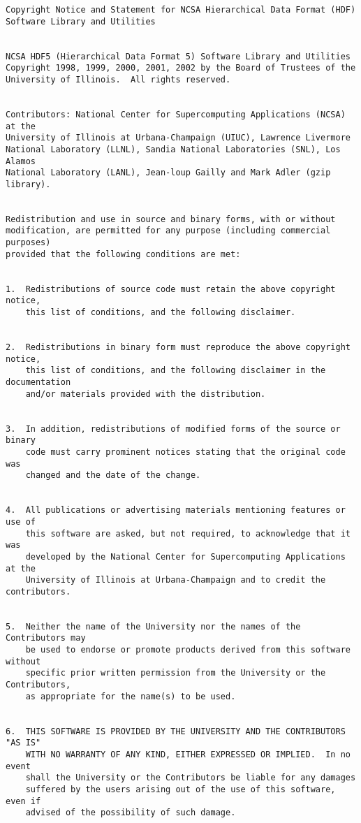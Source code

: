 \begin{verbatim}
Copyright Notice and Statement for NCSA Hierarchical Data Format (HDF)
Software Library and Utilities


NCSA HDF5 (Hierarchical Data Format 5) Software Library and Utilities 
Copyright 1998, 1999, 2000, 2001, 2002 by the Board of Trustees of the 
University of Illinois.  All rights reserved.


Contributors: National Center for Supercomputing Applications (NCSA) at the
University of Illinois at Urbana-Champaign (UIUC), Lawrence Livermore 
National Laboratory (LLNL), Sandia National Laboratories (SNL), Los Alamos 
National Laboratory (LANL), Jean-loup Gailly and Mark Adler (gzip library).


Redistribution and use in source and binary forms, with or without
modification, are permitted for any purpose (including commercial purposes)
provided that the following conditions are met:


1.  Redistributions of source code must retain the above copyright notice,
    this list of conditions, and the following disclaimer.


2.  Redistributions in binary form must reproduce the above copyright notice,
    this list of conditions, and the following disclaimer in the documentation
    and/or materials provided with the distribution.


3.  In addition, redistributions of modified forms of the source or binary
    code must carry prominent notices stating that the original code was
    changed and the date of the change.


4.  All publications or advertising materials mentioning features or use of
    this software are asked, but not required, to acknowledge that it was 
    developed by the National Center for Supercomputing Applications at the 
    University of Illinois at Urbana-Champaign and to credit the contributors.


5.  Neither the name of the University nor the names of the Contributors may
    be used to endorse or promote products derived from this software without
    specific prior written permission from the University or the Contributors,
    as appropriate for the name(s) to be used.


6.  THIS SOFTWARE IS PROVIDED BY THE UNIVERSITY AND THE CONTRIBUTORS "AS IS"
    WITH NO WARRANTY OF ANY KIND, EITHER EXPRESSED OR IMPLIED.  In no event
    shall the University or the Contributors be liable for any damages
    suffered by the users arising out of the use of this software, even if
    advised of the possibility of such damage.



\end{verbatim}
